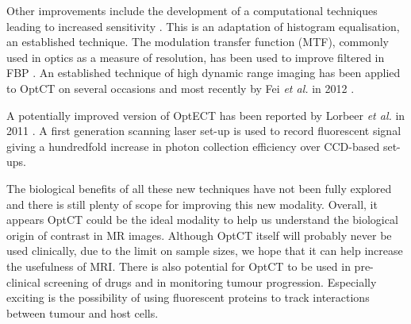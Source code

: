\documentclass[12pt]{article}
\begin{document}
Other improvements include the development of a computational techniques leading to increased sensitivity \cite{Hornblad:2011fh}. This is an adaptation of histogram equalisation, an established technique.
The modulation transfer function (MTF), commonly used in optics as a measure of resolution, has been used to improve filtered in FBP \cite{Chen:2012}.
An established technique of high dynamic range imaging has been applied to OptCT on several occasions and most recently by Fei \textit{et al.} in 2012 \cite{Peng:2012wi}.

A potentially improved version of OptECT has been reported by Lorbeer \textit{et al.} in 2011  \cite{Lorbeer:2011}. A first generation scanning laser set-up is used to record fluorescent signal giving a hundredfold increase in photon collection efficiency over CCD-based set-ups. 

The  biological benefits of all these new techniques have not been fully explored and there is still plenty of scope for improving this new modality.  Overall, it appears OptCT could be the ideal modality to help us understand the biological origin of contrast in MR images. Although OptCT itself will probably never be used clinically, due to the limit on sample sizes, we hope that it can help increase the usefulness of MRI. There is also potential for OptCT to be used in pre-clinical screening of drugs and in monitoring tumour progression. Especially exciting is the possibility of using fluorescent proteins to track interactions between tumour and host cells. 



\end{document}
